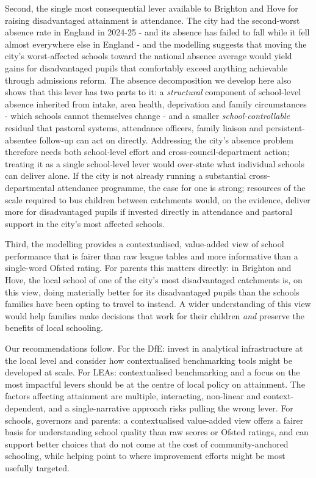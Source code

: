 \documentclass[
  12pt,
  titlepage]{article}
\begin{document}
Second, the single most consequential lever available to Brighton and
Hove for raising disadvantaged attainment is attendance. The city had
the second-worst absence rate in England in 2024-25 - and its absence
has failed to fall while it fell almost everywhere else in England - and
the modelling suggests that moving the city's worst-affected schools
toward the national absence average would yield gains for disadvantaged
pupils that comfortably exceed anything achievable through admissions
reform. The absence decomposition we develop here also shows that this
lever has two parts to it: a \emph{structural} component of school-level
absence inherited from intake, area health, deprivation and family
circumstances - which schools cannot themselves change - and a smaller
\emph{school-controllable} residual that pastoral systems, attendance
officers, family liaison and persistent-absentee follow-up can act on
directly. Addressing the city's absence problem therefore needs both
school-level effort and cross-council-department action; treating it as
a single school-level lever would over-state what individual schools can
deliver alone. If the city is not already running a substantial
cross-departmental attendance programme, the case for one is strong;
resources of the scale required to bus children between catchments
would, on the evidence, deliver more for disadvantaged pupils if
invested directly in attendance and pastoral support in the city's most
affected schools.

Third, the modelling provides a contextualised, value-added view of
school performance that is fairer than raw league tables and more
informative than a single-word Ofsted rating. For parents this matters
directly: in Brighton and Hove, the local school of one of the city's
most disadvantaged catchments is, on this view, doing materially better
for its disadvantaged pupils than the schools families have been opting
to travel to instead. A wider understanding of this view would help
families make decisions that work for their children \emph{and} preserve
the benefits of local schooling.

Our recommendations follow. For the DfE: invest in analytical
infrastructure at the local level and consider how contextualised
benchmarking tools might be developed at scale. For LEAs: contextualised
benchmarking and a focus on the most impactful levers should be at the
centre of local policy on attainment. The factors affecting attainment
are multiple, interacting, non-linear and context-dependent, and a
single-narrative approach risks pulling the wrong lever. For schools,
governors and parents: a contextualised value-added view offers a fairer
basis for understanding school quality than raw scores or Ofsted
ratings, and can support better choices that do not come at the cost of
community-anchored schooling, while helping point to where improvement
efforts might be most usefully targeted.
\end{document}
